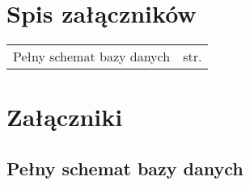 \chapter*{Spis załączników}
\noindent

\begin{tabularx}{\textwidth}{Xl}

    Pełny schemat bazy danych & str. \pageref{file:database-schema} \\

\end{tabularx}

\chapter*{Załączniki}


\section*{Pełny schemat bazy danych}
\label{file:database-schema}
{
\scriptsize

}
\clearpage
